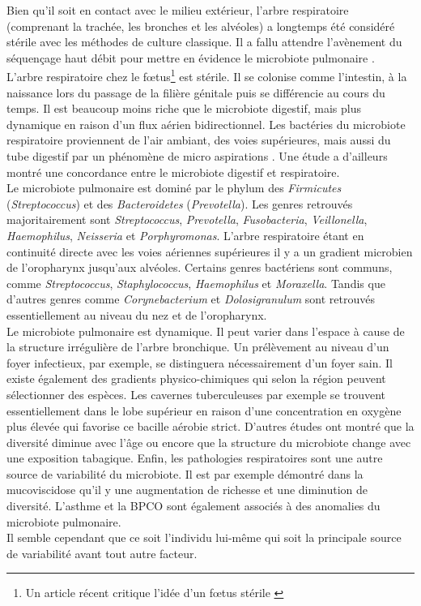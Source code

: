 \documentclass[12pt,a4paper]{article}
\begin{document}
Bien qu'il soit en contact avec le milieu extérieur, l’arbre respiratoire (comprenant la trachée, les bronches et les alvéoles) a longtemps été considéré stérile avec les méthodes de culture classique. Il a fallu attendre l’avènement du séquençage haut débit pour mettre en évidence le microbiote pulmonaire \cite{Hilty2010,HoMan2017,Beck,Dicksonb}.\\
L'arbre respiratoire chez le fœtus\footnote{Un article récent critique l'idée d'un fœtus stérile \cite{Perez-Munoz2017}} est stérile. Il se colonise comme l'intestin, à la naissance lors du passage de la filière génitale puis se différencie au cours du temps. Il est beaucoup moins riche que le microbiote digestif, mais plus dynamique en raison d'un flux aérien bidirectionnel.  Les bactéries du microbiote respiratoire proviennent de l’air ambiant, des voies supérieures, mais aussi du tube digestif par un phénomène de micro aspirations \cite{Dickson}. Une étude a d'ailleurs montré une concordance entre le microbiote digestif et respiratoire\cite{Dickson}.\\
Le microbiote pulmonaire est dominé par le phylum des \textit{Firmicutes} (\textit{Streptococcus}) et des \textit{Bacteroidetes} (\textit{Prevotella}). Les genres retrouvés majoritairement sont \textit{Streptococcus}, \textit{Prevotella}, \textit{Fusobacteria}, \textit{Veillonella}, \textit{Haemophilus}, \textit{Neisseria} et \textit{Porphyromonas}.
L’arbre respiratoire étant en continuité directe avec les voies aériennes supérieures il y a un gradient microbien de l'oropharynx jusqu'aux alvéoles. Certains genres bactériens sont communs, comme \textit{Streptococcus}, \textit{Staphylococcus}, \textit{Haemophilus} et \textit{Moraxella}. Tandis que d’autres genres comme \textit{Corynebacterium} et \textit{Dolosigranulum} sont retrouvés essentiellement au niveau du nez et de l'oropharynx. \\
Le microbiote pulmonaire est dynamique. Il peut varier dans l'espace à cause de la structure irrégulière de l'arbre bronchique. Un prélèvement au niveau d'un foyer infectieux, par exemple, se distinguera nécessairement d'un foyer sain. Il existe également des gradients physico-chimiques qui selon la région peuvent sélectionner des espèces. Les cavernes tuberculeuses par exemple se trouvent essentiellement dans le lobe supérieur en raison d'une concentration en oxygène plus élevée qui favorise ce bacille aérobie strict. D'autres études \cite{Frayman2017,Coburn2015} ont montré que la diversité diminue avec l'âge ou encore que la structure du microbiote change avec une exposition tabagique.
Enfin, les pathologies respiratoires\cite{HoMan2017} sont une autre source de variabilité du microbiote. Il est par exemple démontré dans la mucoviscidose qu'il y une augmentation de richesse et une diminution de diversité. L'asthme et la BPCO sont également associés à des anomalies du microbiote pulmonaire\cite{Dicksona,Nguyen2015}.  \\
Il semble cependant que ce soit l'individu lui-même qui soit la principale source de variabilité avant tout autre facteur\cite{Whelan2017}. 
\end{document}
